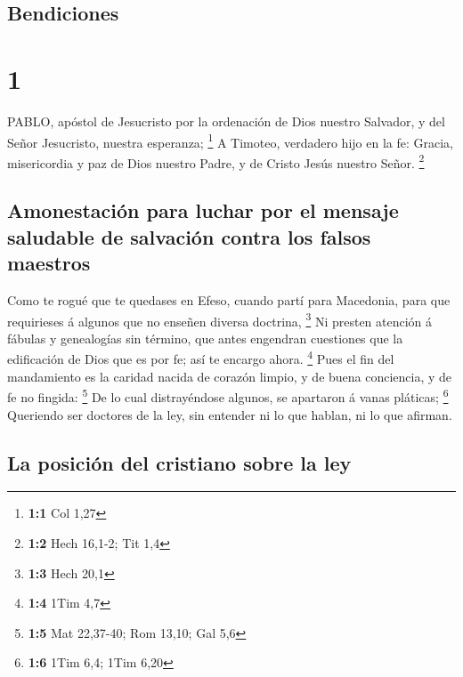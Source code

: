 \hypertarget{bendiciones}{%
\subsection{Bendiciones}\label{bendiciones}}

\hypertarget{section}{%
\section{1}\label{section}}

 PABLO, apóstol de Jesucristo por la ordenación de Dios
nuestro Salvador, y del Señor Jesucristo, nuestra esperanza; \footnote{\textbf{1:1}
  Col 1,27}  A Timoteo, verdadero hijo en la fe: Gracia,
misericordia y paz de Dios nuestro Padre, y de Cristo Jesús nuestro
Señor. \footnote{\textbf{1:2} Hech 16,1-2; Tit 1,4}

\hypertarget{amonestaciuxf3n-para-luchar-por-el-mensaje-saludable-de-salvaciuxf3n-contra-los-falsos-maestros}{%
\subsection{Amonestación para luchar por el mensaje saludable de
salvación contra los falsos
maestros}\label{amonestaciuxf3n-para-luchar-por-el-mensaje-saludable-de-salvaciuxf3n-contra-los-falsos-maestros}}

 Como te rogué que te quedases en Efeso, cuando partí para
Macedonia, para que requirieses á algunos que no enseñen diversa
doctrina, \footnote{\textbf{1:3} Hech 20,1}  Ni presten
atención á fábulas y genealogías sin término, que antes engendran
cuestiones que la edificación de Dios que es por fe; así te encargo
ahora. \footnote{\textbf{1:4} 1Tim 4,7}  Pues el fin del
mandamiento es la caridad nacida de corazón limpio, y de buena
conciencia, y de fe no fingida: \footnote{\textbf{1:5} Mat 22,37-40; Rom
  13,10; Gal 5,6}  De lo cual distrayéndose algunos, se
apartaron á vanas pláticas; \footnote{\textbf{1:6} 1Tim 6,4; 1Tim 6,20}
 Queriendo ser doctores de la ley, sin entender ni lo que
hablan, ni lo que afirman.

\hypertarget{la-posiciuxf3n-del-cristiano-sobre-la-ley}{%
\subsection{La posición del cristiano sobre la
ley}\label{la-posiciuxf3n-del-cristiano-sobre-la-ley}}

